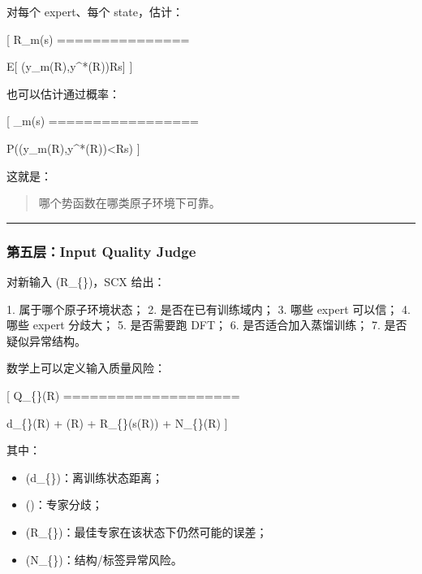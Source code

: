 \documentclass[
  12pt,
]{ctexart}
\newenvironment{Shaded}{}{}
\newcommand{\NormalTok}[1]{#1}
\providecommand{\tightlist}{%
  \setlength{\itemsep}{0pt}\setlength{\parskip}{0pt}}
\begin{document}
对每个 expert、每个 state，估计：

{[} \widehat R\_m(s) ===============

\mathbb E{[} \ell(y\_m(R),y\^{}*(R))\mid R\in s{]} {]}

也可以估计通过概率：

{[} \_m(s) =================

P(\ell(y\_m(R),y\^{}*(R))\textless{}\tau\mid R\in s) {]}

这就是：

\begin{quote}
哪个势函数在哪类原子环境下可靠。
\end{quote}

\begin{center}\rule{0.5\linewidth}{0.5pt}\end{center}

\subsubsection{第五层：Input Quality
Judge}\label{ux7b2cux4e94ux5c42input-quality-judge}

对新输入 (R\_\{\})，SCX 给出：

\begin{Shaded}
\begin{Highlighting}[]
\NormalTok{1. 属于哪个原子环境状态；}
\NormalTok{2. 是否在已有训练域内；}
\NormalTok{3. 哪些 expert 可以信；}
\NormalTok{4. 哪些 expert 分歧大；}
\NormalTok{5. 是否需要跑 DFT；}
\NormalTok{6. 是否适合加入蒸馏训练；}
\NormalTok{7. 是否疑似异常结构。}
\end{Highlighting}
\end{Shaded}

数学上可以定义输入质量风险：

{[} Q\_\{\}(R) ====================

\alpha d\_\{\}(R) + \beta {}(R) +
\gamma \widehat R\_\{\min\}(s(R)) + \delta N\_\{\}(R) {]}

其中：

\begin{itemize}
\tightlist
\item
  (d\_\{\})：离训练状态距离；
\item
  ()：专家分歧；
\item
  (\widehat R\_\{\min\})：最佳专家在该状态下仍然可能的误差；
\item
  (N\_\{\})：结构/标签异常风险。
\end{itemize}
\end{document}

